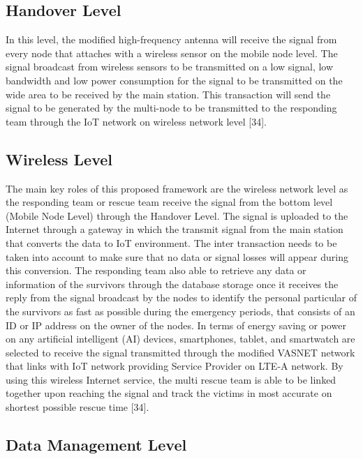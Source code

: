 \documentclass{article}
\begin{document}
\subsection{Handover Level}

In this level, the modified high-frequency antenna will receive the signal from every node that attaches with a wireless sensor on the mobile node level. The signal broadcast from wireless sensors to be transmitted on a low signal, low bandwidth and low power consumption for the signal to be transmitted on the wide area to be received by the main station. This transaction will send the signal to be generated by the multi-node to be transmitted to the responding team through the IoT network on wireless network level [34].

\subsection{Wireless Level}

The main key roles of this proposed framework are the wireless network level as the responding team or rescue team receive the signal from the bottom level (Mobile Node Level) through the Handover Level. The signal is uploaded to the Internet through a gateway in which the transmit signal from the main station that converts the data to IoT environment. The inter transaction needs to be taken into account to make sure that no data or signal losses will appear during this conversion. The responding team also able to retrieve any data or information of the survivors through the database storage once it receives the reply from the signal broadcast by the nodes to identify the personal particular of the survivors as fast as possible during the emergency periods, that consists of an ID or IP address on the owner of the nodes. In terms of energy saving or power on any artificial intelligent (AI) devices, smartphones, tablet, and smartwatch are selected to receive the signal transmitted through the modified VASNET network that links with IoT network providing Service Provider on LTE-A network. By using this wireless Internet service, the multi rescue team is able to be linked together upon reaching the signal and track the victims in most accurate on shortest possible rescue time [34].

\subsection{Data Management Level}
\end{document}
